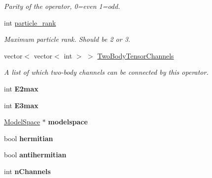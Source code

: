 \begin{DoxyCompactItemize}
\begin{DoxyCompactList}\small\item\em Parity of the operator, 0=even 1=odd. \end{DoxyCompactList}\item 
\hypertarget{classOperator_a44a74c03caff49e776433e885a724956}{int \hyperlink{classOperator_a44a74c03caff49e776433e885a724956}{particle\-\_\-rank}}\label{classOperator_a44a74c03caff49e776433e885a724956}

\begin{DoxyCompactList}\small\item\em Maximum particle rank. Should be 2 or 3. \end{DoxyCompactList}\item 
\hypertarget{classOperator_aba9a01095cd3e3433716dc74daba4fcc}{vector$<$ vector$<$ int $>$ $>$ \hyperlink{classOperator_aba9a01095cd3e3433716dc74daba4fcc}{Two\-Body\-Tensor\-Channels}}\label{classOperator_aba9a01095cd3e3433716dc74daba4fcc}

\begin{DoxyCompactList}\small\item\em A list of which two-\/body channels can be connected by this operator. \end{DoxyCompactList}\item 
\hypertarget{classOperator_ace64ea3f299cfba00bc973e58ce03414}{int {\bfseries E2max}}\label{classOperator_ace64ea3f299cfba00bc973e58ce03414}

\item 
\hypertarget{classOperator_ad3ebb434f911b9cb7c54ca6990cdda8c}{int {\bfseries E3max}}\label{classOperator_ad3ebb434f911b9cb7c54ca6990cdda8c}

\item 
\hypertarget{classOperator_af08ef1c6d3ef38d08b4a6ea20b26ef22}{\hyperlink{classModelSpace}{Model\-Space} $\ast$ {\bfseries modelspace}}\label{classOperator_af08ef1c6d3ef38d08b4a6ea20b26ef22}

\item 
\hypertarget{classOperator_ad46a54204c51cf5c82e4c489217bd2c1}{bool {\bfseries hermitian}}\label{classOperator_ad46a54204c51cf5c82e4c489217bd2c1}

\item 
\hypertarget{classOperator_a86dd30fca215948dd9307fa45b7a2e32}{bool {\bfseries antihermitian}}\label{classOperator_a86dd30fca215948dd9307fa45b7a2e32}

\item 
\hypertarget{classOperator_a710cd3c6107a4497e90a04c1f3d2b15f}{int {\bfseries n\-Channels}}\label{classOperator_a710cd3c6107a4497e90a04c1f3d2b15f}

\end{DoxyCompactItemize}
